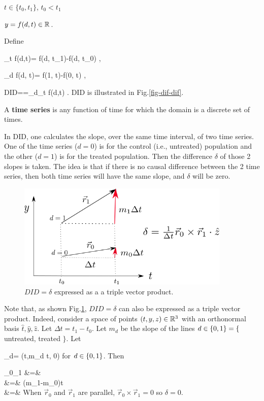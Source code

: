$t\in \{t_0, t_1\}$, $t_0< t_1$

$y=f(d,t)\in { \mathbb{R}}$.

Define

\beq
\Delta_t f(d,t)= f(d, t_1)-f(d, t_0)
\;,
\eeq

\beq
\Delta_d f(d, t)= f(1, t)-f(0, t)
\;,
\eeq

\beq
DID=\delta=\Delta_d\Delta_t f(d,t)
\;.
\eeq
DID is illustrated in
 Fig.\ref{fig-dif-dif}. 


A {\bf time series} 
is  any function of time
for which the domain is a discrete set of times.


In DID, one calculates the slope,
over the same
time interval,
of two time series. One
of the time series ($d=0$)
is for
the control (i.e., untreated) population
and the other ($d=1$) is
 for the treated population.
Then the 
difference $\delta$ of those 2 slopes is taken.
The idea is that if there is no causal difference
between the 2 time series,
then both time
series will 
have the same slope, and
$\delta$ will be zero.

\begin{figure}[h!]
\centering
\includegraphics[width=4in]
{did/did-3-prod}
\caption{$DID=\delta$ expressed as a 
a triple vector product.} 
\label{fig-did-3-prod}
\end{figure}

Note that,
as shown Fig.\ref{fig-did-3-prod},
$DID=\delta$ can also be expressed
as a triple vector product. Indeed,
consider a space
of points $(t, y, z)\in{ \mathbb{R}}^3$ with
an orthonormal basis
$\hat{t}, \hat{y}, \hat{z}$.
Let $\Delta t = t_1-t_0$.
Let $m_d$ be the slope
of the lines $d\in\{0,1\}=
\{$ untreated, treated $\}$. Let

\beq
{}_d=
(\Delta t,m_d  \Delta t, 0)
\eeq
for $d\in\{0,1\}$.
 Then
 
\beqa
{}
_0\times {}_1\cdot {}
&=&
\det
{}
\\
&=&
(m_1-m_0)\Delta t 
\\
&=& \delta
\eeqa
When $\vec{r}_0$ and $\vec{r}_1$ are 
parallel, $\vec{r}_0\times \vec{r}_1=0$
so $\delta=0$.

